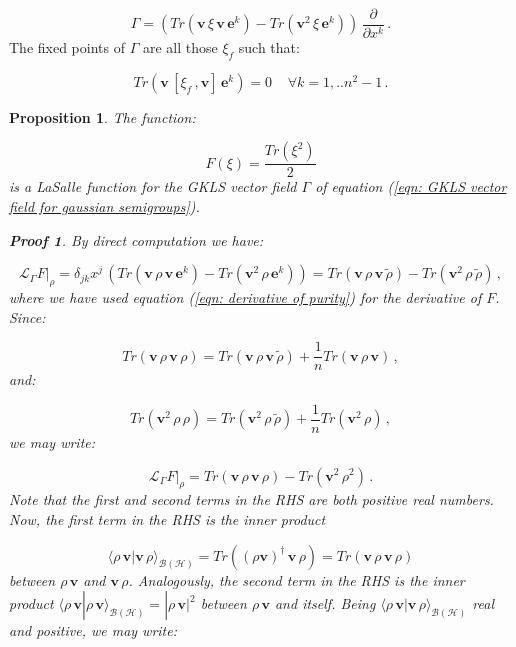 \documentclass[11pt]{article}
\newcommand{\be}{\begin{equation}}
\newcommand{\ee}{\end{equation}}
\newtheorem{prop}{Proposition}
\newtheorem*{pf}{Proof}
\begin{document}
\be\label{eqn: GKLS vector field for gaussian semigroups}
\Gamma = \left(Tr\left(\mathbf{v}\,\xi\,\mathbf{v}\,\mathbf{e}^{k}\right) - Tr\left(\mathbf{v}^{2}\,\xi\,\mathbf{e}^{k}\right)\right)\,\frac{\partial}{\partial x^{k}}\,.
\ee
The fixed points of $\Gamma$ are all those $\xi_{f}$ such that:

\be
Tr\left(\mathbf{v}\,\left[\xi_{f}\,,\mathbf{v}\right]\,\mathbf{e}^{k}\right)=0\;\;\;\;\forall k=1,..n^{2}-1\,.
\ee

\begin{prop}
The function:

\be
F(\xi)=\frac{Tr\left(\xi^{2}\right)}{2}
\ee
is a LaSalle function for the GKLS vector field $\Gamma$ of equation (\ref{eqn: GKLS vector field for gaussian semigroups}).

\begin{pf}
By direct computation we have:

\be
\left.\mathcal{L}_{\Gamma}F\right|_{\rho}=\delta_{jk}x^{j}\,\left(Tr\left(\mathbf{v}\,\rho\,\mathbf{v}\,\mathbf{e}^{k}\right) - Tr\left(\mathbf{v}^{2}\,\rho\,\mathbf{e}^{k}\right)\right)=Tr\left(\mathbf{v}\,\rho\,\mathbf{v}\,\tilde{\rho}\right) - Tr\left(\mathbf{v}^{2}\,\rho\,\tilde{\rho}\right)\,,
\ee
where we have used equation (\ref{eqn: derivative of purity}) for the derivative of $F$.
Since:

\be
Tr\left(\mathbf{v}\,\rho\,\mathbf{v}\,\rho\right)=Tr\left(\mathbf{v}\,\rho\,\mathbf{v}\,\tilde{\rho}\right) + \frac{1}{n}Tr\left(\mathbf{v}\,\rho\,\mathbf{v}\right)\,,
\ee
and:

\be
Tr\left(\mathbf{v}^{2}\,\rho\,\rho\right)=Tr\left(\mathbf{v}^{2}\,\rho\,\tilde{\rho}\right) + \frac{1}{n}Tr\left(\mathbf{v}^{2}\,\rho\right)\,,
\ee
we may write:

\be
\left.\mathcal{L}_{\Gamma}F\right|_{\rho}=Tr\left(\mathbf{v}\,\rho\,\mathbf{v}\,\rho\right) - Tr\left(\mathbf{v}^{2}\,\rho^{2}\right)\,.
\ee
Note that the first and second terms in the RHS are both positive real numbers.
Now, the first term in the RHS is the inner product 

$$
\langle \rho\,\mathbf{v}|\mathbf{v}\,\rho\rangle_{\mathcal{B}(\mathcal{H})}=Tr\left((\rho\mathbf{v})^{\dagger}\,\mathbf{v}\,\rho\right)=Tr\left(\mathbf{v}\,\rho\,\mathbf{v}\,\rho\right)
$$
between $\rho\,\mathbf{v}$ and $\mathbf{v}\,\rho$.
Analogously, the second term in the RHS is the inner product $\langle \rho\,\mathbf{v}|\rho\,\mathbf{v}\rangle_{\mathcal{B}(\mathcal{H})}=|\rho\,\mathbf{v}|^{2}$ between $\rho\,\mathbf{v}$ and itself.
Being $\langle \rho\,\mathbf{v}|\mathbf{v}\,\rho\rangle_{\mathcal{B}(\mathcal{H})}$ real and positive, we may write:


\end{pf}
\end{prop}
\end{document}
